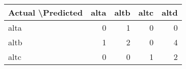 \begin{tabular}{lrrrr}
\toprule
Actual \textbackslash   Predicted &  alta &  altb &  altc &  altd \\
\midrule
               alta &     0 &     1 &     0 &     0 \\
               altb &     1 &     2 &     0 &     4 \\
               altc &     0 &     0 &     1 &     2 \\
\bottomrule
\end{tabular}
